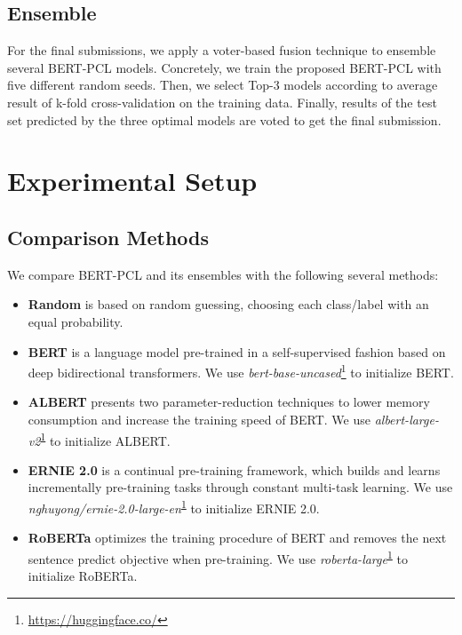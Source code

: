\documentclass[11pt]{article}
\begin{document}
\subsection{Ensemble}
For the final submissions, we apply a voter-based fusion technique \citep{DBLP:conf/sspr/MorvantHA14} to ensemble several BERT-PCL models.
Concretely, we train the proposed BERT-PCL with five different random seeds. 
Then, we select Top-3 models according to average result of k-fold cross-validation on the training data.
Finally, results of the test set predicted by the three optimal models are voted to get the final submission.



\section{Experimental Setup}
\subsection{Comparison Methods}

We compare BERT-PCL and its ensembles with the following several methods:
\begin{itemize}
    \item \textbf{Random} is based on random guessing, choosing each class/label with an equal probability.
\item \textbf{BERT}  \citep{DBLP:conf/naacl/DevlinCLT19} is a language model pre-trained in a self-supervised fashion based on deep bidirectional transformers.  We use \textit{bert-base-uncased}\footnote{\url{https://huggingface.co/}\label{code}} to initialize BERT. 
\item \textbf{ALBERT} \citep{DBLP:conf/iclr/LanCGGSS20} presents two parameter-reduction techniques to lower memory consumption and increase the training speed of BERT. 
    We use \textit{albert-large-v2}\textsuperscript{\ref{code}} to initialize ALBERT. 
    \item \textbf{ERNIE 2.0} \citep{DBLP:conf/aaai/SunWLFTWW20} is a continual pre-training framework, which builds and learns incrementally pre-training tasks through constant multi-task learning.
    We use \textit{nghuyong/ernie-2.0-large-en}\textsuperscript{\ref{code}} to initialize ERNIE 2.0. 
    \item \textbf{RoBERTa} \citep{DBLP:journals/corr/abs-1907-11692} optimizes the training procedure of BERT and removes the next sentence predict objective when pre-training.
    We use \textit{roberta-large}\textsuperscript{\ref{code}} to initialize RoBERTa. 
\end{itemize}
\end{document}
